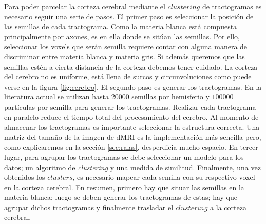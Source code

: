 Para poder parcelar la corteza cerebral mediante el $clustering$ de 
tractogramas es necesario seguir una serie de pasos. El primer paso es
seleccionar la posici\'on de las semillas de cada tractograma. Como la
materia blanca est\'a compuesta principalmente por axones, es en ella
donde se sit\'uan las semillas. Por ello, seleccionar los voxels que 
ser\'an semilla requiere contar con alguna manera de discriminar
entre materia blanca y materia gris. Si adem\'as queremos que las
semillas est\'en a cierta distancia de la corteza debemos tener cuidado.
La corteza del cerebro no es uniforme, est\'a llena de surcos y 
circunvoluciones como puede verse en la figura \ref{fig:cerebro}.
El segundo paso es generar los tractogramas. En la literatura actual se
utilizan hasta $20000$ semillas por hemisferio 
\cite{Moreno-Dominguez2014} y $100000$ part\'iculas por semilla 
\cite{Anwander2006} para generar los tractogramas. Realizar cada
tractograma en paralelo reduce el tiempo total del procesamiento del
cerebro. Al momento de almacenar los tractogramas es importante
seleccionar la
estructura correcta. Una matriz del tama\~no de la imagen de dMRI es la
implementaci\'on m\'as sencilla pero, como explicaremos en la secci\'on 
\ref{sec:ralas}, desperdicia mucho espacio. En tercer lugar, para agrupar
los tractogramas se debe seleccionar un modelo para los datos; un
algoritmo de \textit{clustering} y una medida de similitud. Finalmente,
una vez obtenidos los $clusters$, es necesario mapear cada semilla con su
respectivo voxel en la corteza cerebral. En resumen, primero hay 
que situar las semillas en la materia blanca; luego se deben generar los 
tractogramas de estas; hay que agrupar dichos tractogramas y finalmente 
trasladar el $clustering$ a la corteza cerebral. \\
 
